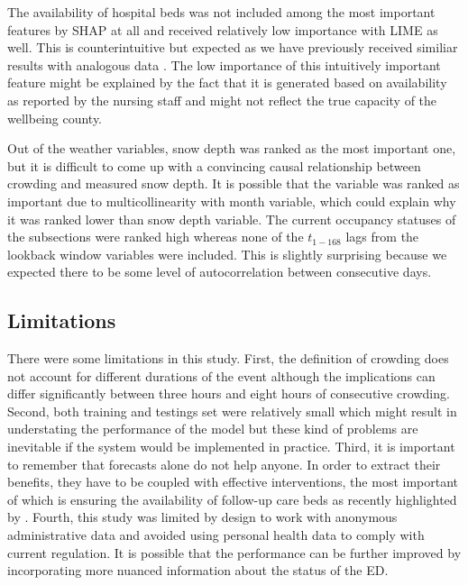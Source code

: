 The availability of hospital beds was not included among the most important features by SHAP at all and received relatively low importance with LIME as well. This is counterintuitive but expected as we have previously received similiar results with analogous data \cite{Tuominen2024}. The low importance of this intuitively important feature might be explained by the fact that it is generated based on availability as reported by the nursing staff and might not reflect the true capacity of the wellbeing county.

Out of the weather variables, snow depth was ranked as the most important one, but it is difficult to come up with a convincing causal relationship between crowding and measured snow depth. It is possible that the variable was ranked as important due to multicollinearity with month variable, which could explain why it was ranked lower than snow depth variable. The current occupancy statuses of the subsections were ranked high whereas none of the $t_{1-168}$ lags from the lookback window variables were included. This is slightly surprising because we expected there to be some level of autocorrelation between consecutive days.



\subsection{Limitations}

There were some limitations in this study. First, the definition of crowding does not account for different durations of the event although the implications can differ significantly between three hours and eight hours of consecutive crowding. Second, both training and testings set were relatively small which might result in understating the performance of the model but these kind of problems are inevitable if the system would be implemented in practice. Third, it is important to remember that forecasts alone do not help anyone. In order to extract their benefits, they have to be coupled with effective interventions, the most important of which is ensuring the availability of follow-up care beds as recently highlighted by \citet{Stewart2024}. Fourth, this study was limited by design to work with anonymous administrative data and avoided using personal health data to comply with current regulation. It is possible that the performance can be further improved by incorporating more nuanced information about the status of the ED.